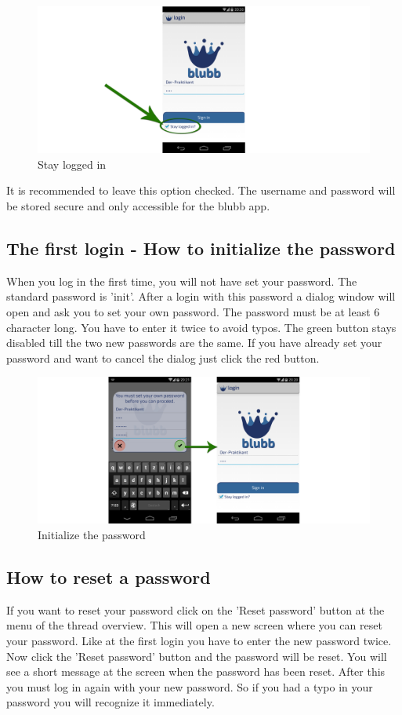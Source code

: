 \documentclass[12pt,a4paper,oneside]{report}
\newcommand{\appname}{blubb}
\begin{document}
\begin{figure}[!ht]
    \includegraphics[width=\linewidth]{StayLoggedIn.png}
    \caption{Stay logged in}
\end{figure}

It is recommended to leave this option checked. The username and password will be stored secure and only accessible for the \appname{} app.

\subsection{The first login - How to initialize the password} \label{subsubsec:init}
When you log in the first time, you will not have set your password. The standard password is 'init'. After a login with this password a dialog window will open and ask you to set your own password. The password must be at least 6 character long. You have to enter it twice to avoid typos. The green button stays disabled till the two new passwords are the same. If you have already set your password and want to cancel the dialog just click the red button.

\begin{figure}[!ht]
    \includegraphics[width=\linewidth]{InitializePW.png}
    \caption{Initialize the password}
\end{figure}


\subsection{How to reset a password}
If you want to reset your password click on the 'Reset password' button at the menu of the thread overview. This will open a new screen where you can reset your password. Like at the first login you have to enter the new password twice. Now click the 'Reset password' button and the password will be reset. You will see a short message at the screen when the password has been reset. After this you must log in again with your new password. So if you had a typo in your password you will recognize it immediately.
\end{document}
